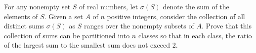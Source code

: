 For any nonempty set $S$ of real numbers, let $\sigma(S)$ denote the sum of the elements of $S$. Given a set $A$ of $n$ positive integers, consider the collection of all distinct sums $\sigma(S)$ as $S$ ranges over the nonempty subsets of $A$.  Prove that this collection of sums can be partitioned into $n$ classes so that in each class, the ratio of the largest sum to the smallest sum does not exceed 2.